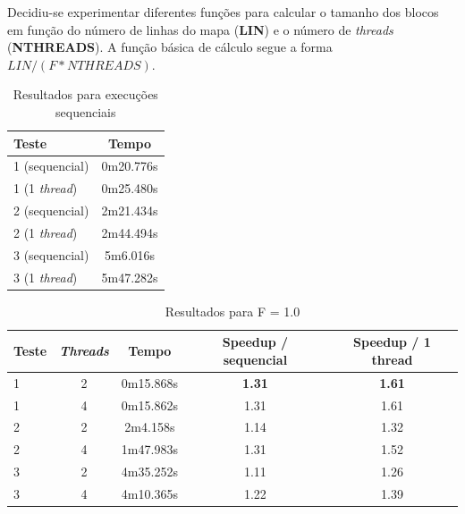 \documentclass[12pt]{article}
\begin{document}
Decidiu-se experimentar diferentes funções para calcular o tamanho dos blocos em função do número de linhas
do mapa (\textbf{LIN}) e o número de \textit{threads} (\textbf{NTHREADS}). A função básica de cálculo
segue a forma $LIN / (F * NTHREADS)$.

\begin{table}[H]
\begin{center}
    \begin{tabular}{ | l | c |}
      \hline
      \textbf{Teste} & \textbf{Tempo} \\ \hline
      1 (sequencial) & 0m20.776s \\ \hline
      1 (1 \textit{thread}) & 0m25.480s \\ \hline
      2 (sequencial) & 2m21.434s \\ \hline
      2 (1 \textit{thread}) & 2m44.494s \\ \hline
      3 (sequencial) & 5m6.016s \\ \hline
      3 (1 \textit{thread}) & 5m47.282s \\ \hline
  \end{tabular}
  \caption{Resultados para execuções sequenciais}
  \label{tbl:resultados_seq}
\end{center}
\end{table}

\begin{table}[H]
  \begin{center}
    \begin{tabular}{ | l | c | c | c | c |}
      \hline
      \textbf{Teste} & \textbf{\textit{Threads}} & \textbf{Tempo} & \textbf{Speedup / sequencial} & \textbf{Speedup / 1 thread}\\ \hline
      1 & 2 & 0m15.868s & \textbf{1.31} & \textbf{1.61} \\ \hline
      1 & 4 & 0m15.862s & 1.31 & 1.61 \\ \hline
      2 & 2 & 2m4.158s & 1.14 & 1.32 \\ \hline
      2 & 4 & 1m47.983s & 1.31 & 1.52 \\ \hline
      3 & 2 & 4m35.252s & 1.11 & 1.26 \\ \hline
      3 & 4 & 4m10.365s & 1.22 & 1.39 \\ \hline
  \end{tabular}
  \caption{Resultados para F = 1.0}
  \label{tbl:resultados1}
  \end{center}
\end{table}
\end{document}
